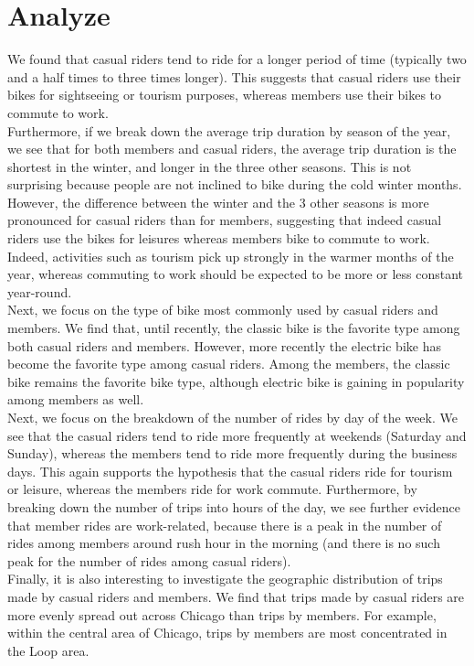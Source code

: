 \documentclass[11pt,twoside]{article}
\theoremstyle{plain}
\theoremstyle{definition}
\theoremstyle{remark}
\begin{document}
\section{Analyze}
We found that casual riders tend to ride for a longer period of time (typically two and a half times to three times longer). This suggests that casual riders use their bikes for sightseeing or tourism purposes, whereas members use their bikes to commute to work.\\ Furthermore, if we break down the average trip duration by season of the year, we see that for both members and casual riders, the average trip duration is the shortest in the winter, and longer in the three other seasons. This is not surprising because people are not inclined to bike during the cold winter months. However, the difference between the winter and the 3 other seasons is more pronounced for casual riders than for members, suggesting that indeed casual riders use the bikes for leisures whereas members bike to commute to work. Indeed, activities such as tourism pick up strongly in the warmer months of the year, whereas commuting to work should be expected to be more or less constant year-round.\\
Next, we focus on the type of bike most commonly used by casual riders and members. We find that, until recently, the classic bike is the favorite type among both casual riders and members. However, more recently the electric bike has become the favorite type among casual riders. Among the members, the classic bike remains the favorite bike type, although electric bike is gaining in popularity among members as well.\\
Next, we focus on the breakdown of the number of rides by day of the week. We see that the casual riders tend to ride more frequently at weekends (Saturday and Sunday), whereas the members tend to ride more frequently during the business days. This again supports the hypothesis that the casual riders ride for tourism or leisure, whereas the members ride for work commute. Furthermore, by breaking down the number of trips into hours of the day, we see further evidence that member rides are work-related, because there is a peak in the number of rides among members around rush hour in the morning (and there is no such peak for the number of rides among casual riders).\\
Finally, it is also interesting to investigate the geographic distribution of trips made by casual riders and members. We find that trips made by casual riders are more evenly spread out across Chicago than trips by members. For example, within the central area of Chicago, trips by members are most concentrated in the Loop area.
\end{document}
